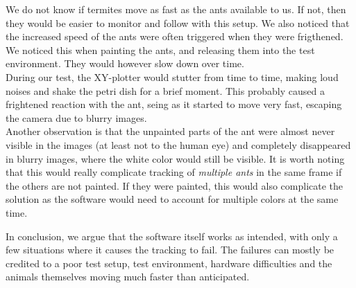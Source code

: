 We do not know if termites move as fast as the ants available to us. If not, then they would be easier to monitor and follow with this setup. We also noticed that the increased speed of the ants were often triggered when they were frigthened. We noticed this when painting the ants, and releasing them into the test environment. They would however slow down over time. \\

During our test, the XY-plotter would stutter from time to time, making loud noises and shake the petri dish for a brief moment. This probably caused a frightened reaction with the ant, seing as it started to move very fast, escaping the camera due to blurry images. \\

Another observation is that the unpainted parts of the ant were almost never visible in the images (at least not to the human eye) and completely disappeared in blurry images, where the white color would still be visible. It is worth noting that this would really complicate tracking of \emph{multiple ants} in the same frame if the others are not painted. If they were painted, this would also complicate the solution as the software would need to account for multiple colors at the same time.\\


In conclusion, we argue that the software itself works as intended, with only a few situations where it causes the tracking to fail. The failures can mostly be credited to a poor test setup, test environment, hardware difficulties and the animals themselves moving much faster than anticipated.\\